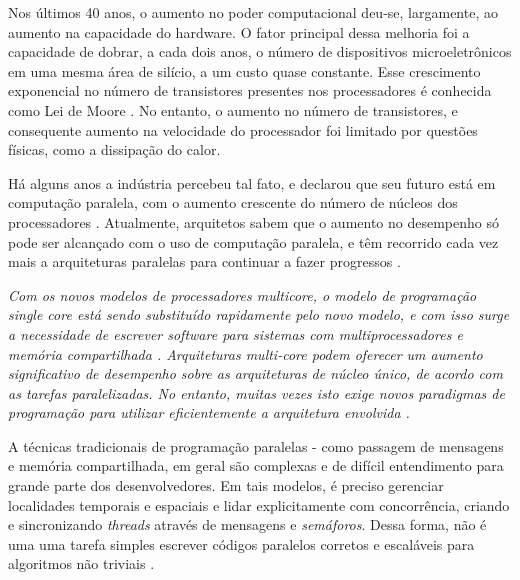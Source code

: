 Nos últimos 40 anos, o aumento no poder computacional deu-se, largamente, ao aumento na capacidade do hardware. O fator principal dessa melhoria foi a capacidade de dobrar, a cada dois anos, o número de dispositivos microeletrônicos em uma mesma área de silício, a um custo quase constante. Esse crescimento exponencial no número de transistores presentes nos processadores é conhecida como Lei de Moore \cite{Manferdelli:2008}.  No entanto, o aumento no número de transistores, e consequente aumento na velocidade do processador foi limitado por questões físicas, como a dissipação do calor. %
  
Há alguns anos a indústria percebeu tal fato, e declarou que seu futuro está em computação paralela, com o aumento crescente do número de núcleos dos processadores \cite{Asanovic:2009}. Atualmente, arquitetos sabem que o aumento no desempenho só pode ser alcançado com o uso de computação paralela, e têm recorrido cada vez mais a arquiteturas paralelas para continuar a fazer progressos \cite{Manferdelli:2008}. 


\textit{Com os novos modelos de processadores \textit{multicore}, o modelo de programação \textit{single core} está sendo substituído rapidamente pelo novo modelo, e com isso surge a necessidade de escrever software para sistemas com multiprocessadores e memória compartilhada \cite{Ernst:2009}. 
Arquiteturas \textit{multi-core} podem oferecer um aumento significativo de desempenho sobre as arquiteturas de núcleo único, de acordo com as tarefas paralelizadas. No entanto, muitas vezes isto exige novos paradigmas de programação para utilizar eficientemente a arquitetura envolvida \cite{Prinslow:2011}. 
}

A técnicas tradicionais de programação paralelas - como passagem de mensagens e memória compartilhada, em geral são complexas e de difícil entendimento para grande parte dos desenvolvedores. Em tais modelos, é preciso gerenciar localidades temporais e espaciais e lidar explicitamente com concorrência, criando e sincronizando \textit{threads} através de mensagens e \textit{semáforos}. Dessa forma, não é uma uma tarefa simples escrever códigos paralelos corretos e escaláveis para algoritmos não triviais \cite{Ranger:2007}.


